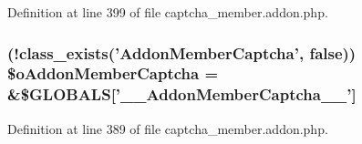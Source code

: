 Definition at line 399 of file captcha\-\_\-member.\-addon.\-php.

\hypertarget{captcha__member_8addon_8php_a31cda8178bc3156a0f1ea23c851844dd}{
\subsubsection[{\$o\-Addon\-Member\-Captcha}]{ (!class\-\_\-exists('Addon\-Member\-Captcha', false)) \$o\-Addon\-Member\-Captcha = \&\$G\-L\-O\-B\-A\-L\-S\mbox{[}'\-\_\-\-\_\-\-Addon\-Member\-Captcha\-\_\-\-\_\-'\mbox{]}}}\label{captcha__member_8addon_8php_a31cda8178bc3156a0f1ea23c851844dd}


Definition at line 389 of file captcha\-\_\-member.\-addon.\-php.

